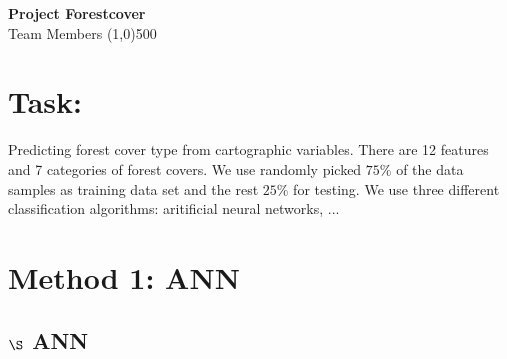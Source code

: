 \documentclass[11pt]{article}  %
\begin{document}
\begingroup
    \fontsize{18pt}{25pt}\selectfont

    \begin{center}
    \textbf{Project Forestcover}\\
\begingroup
\fontsize{10pt}{212pt}\selectfont
Team Members
\endgroup
\line(1,0){500}
\end{center}
\endgroup

\section*{Task:}
Predicting forest cover type from cartographic variables. There are 12 features and 7 categories of forest covers. We use randomly picked $75\%$ of the data samples as training data set and the rest $25\%$ for testing. We use three different classification algorithms: aritificial neural networks, ...
\section*{Method 1: ANN}


\subsection*{$\S$ ANN}
\end{document}
